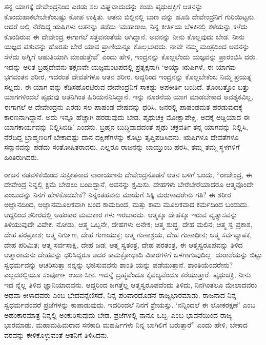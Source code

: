 ತನ್ನ ಯಾಗಕ್ಕೆ ದೇವೇಂದ್ರನಿಂದ ಎರಡು ಸಲ ವಿಘ್ನವಾದುದನ್ನು ಕಂಡು ಪೃಥುಚಕ್ರಿಗೆ ಆತನನ್ನು ಕೊಂದುಹಾಕಲೇಬೇಕೆಂಬಷ್ಟು ಕೋಪ ಉಕ್ಕಿತು. ಆತನು ಬಿಲ್ಲಿನಲ್ಲಿ ಬಾಣ ವನ್ನು ಹೂಡಿ ದೇವೇಂದ್ರನಿಗೆ ಗುರಿಯಿಟ್ಟನು. ಆದರೆ ಅಲ್ಲಿ ನೆರೆದಿದ್ದ ಋಷಿಗಳು ಆತನನ್ನು ತಡೆದು ‘ಮಹಾರಾಜ, ನಿನ್ನ ಕೀರ್ತಿಯ ಬೆಳಕಿನಲ್ಲಿ ಕಳೆಯನ್ನು ಕಳೆದು ಕೊಂಡಿರುವ ಈ ದೇವೇಂದ್ರ ಈಗಾಗಲೆ ಸತ್ತವನಂತೆಯೆ ಆಗಿದ್ದಾನೆ. ಅವನನ್ನು ನೀನು ಕೊಲ್ಲವುದು ಬೇಡ. ನೀನು ಯಜ್ಞದ ಪಶುವನ್ನು ಹೊರತು ಬೇರೆ ಯಾವ ಪ್ರಾಣಿಯನ್ನೂ ಕೊಲ್ಲಬಾರದು. ನಾವೇ ನಮ್ಮ ಮಂತ್ರದಿಂದ ಅವನನ್ನು ಸೆಳೆದು ಅಗ್ನಿಗೆ ಆಹುತಿಯಾಗಿ ಮಾಡುತ್ತೇವೆ’ ಎಂದು ಹೇಳಿ, ಇಂದ್ರನನ್ನು ಕೊಲ್ಲಲೆಂದು ಯಜ್ಞವನ್ನು ಪ್ರಾರಂಭಿಸಿ ದರು. ಇದನ್ನು ಅರಿತ ಬ್ರಹ್ಮದೇವನು ತಕ್ಷಣವೇ ಯಜ್ಞಮಂಟಪದಲ್ಲಿ ಪ್ರತ್ಯಕ್ಷನಾಗಿ ‘ಅಯ್ಯಾ ಋಷಿಗಳೆ, ಈ ಯಾಗವು ಭಗವಂತನ ಶರೀರ, ಇದರಂತೆ ದೇವತೆಗಳೂ ಆತನ ಶರೀರ. ಆದ್ದರಿಂದ ಇಂದ್ರನನ್ನು ಕೊಲ್ಲಬೇಕೆಂಬ ನಿಮ್ಮ ಪ್ರಯತ್ನ ಸಲ್ಲದು. ಈ ಯಾಗ ವನ್ನು ಕೆಡಿಸಹೊರಟಿರುವ ದೇವೇಂದ್ರನಿಗೆ ಸಾಕಷ್ಟು ಅಪಕೀರ್ತಿ ಬಂದಿದೆ. ತೊಂಬತ್ತೊಂ ಬತ್ತು ಯಾಗಗಳಿಂದಲೆ ಪೃಥುವು ಆತನಿಗಿಂತ ಹಿರಿಯನೆನಿಸಿದ್ದಾನೆ. ಇನ್ನು ನೂರನೆಯ ಯಾಗ ಮಾಡಬೇಕಾದ ಅವಶ್ಯಕವಿಲ್ಲ. ಈಗಾಗಲೆ ಆ ದೇವೇಂದ್ರನು ಎರಡು ಸಲ ಪಾಷಂಡ ವೇಷವನ್ನು ಧರಿಸಿ, ಜನರಲ್ಲಿ ಪಾಷಂಡಮತ ಹರಡುವುದಕ್ಕೆ ಕಾರಣನಾಗಿದ್ದಾನೆ. ಅದು ಇನ್ನೂ ಹೆಚ್ಚಾಗಿ ಹರಡುವುದು ಬೇಡ. ಪೃಥುಚಕ್ರಿ ಮೋಕ್ಷಾಪೇಕ್ಷಿ. ಅದಕ್ಕೆ ಅಡ್ಡಿಯಾದ ಈ ಯಾಗಕಾರ್ಯವನ್ನು ನಿಲ್ಲಿಸಿಬಿಡಿ’ ಎಂದನು. ಬ್ರಹ್ಮನ ಬುದ್ಧಿವಾದದಂತೆ ಪೃಥು ಚಕ್ರವರ್ತಿ ತನ್ನ ಯಾಗವನ್ನು ನಿಲ್ಲಿಸಿ, ನೆರೆದಿದ್ದ ಬ್ರಾಹ್ಮಣರಿಗೆ ಬೇಕಾದಷ್ಟು ದಾನ ದಕ್ಷಿಣೆಗಳನ್ನು ಕೊಟ್ಟು ತೃಪ್ತಿಪಡಿಸಿದನು. ಋಷಿಗಳೂ ದೇವತೆಗಳೂ ಸನ್ಮಾನವನ್ನು ಪಡೆದು ಸಂತೋಷಿತರಾದರು. ಎಲ್ಲರೂ ರಾಜನನ್ನು ಬಾಯ್ತುಂಬ ಹರಸಿ, ತಮ್ಮ ತಮ್ಮ ಸ್ಥಳಗಳಿಗೆ ಹಿಂತಿರುಗಿದರು.

ರಾಜನ ನಡವಳಿಕೆಯಿಂದ ಸುಪ್ರೀತನಾದ ನಾರಾಯಣನು ದೇವೇಂದ್ರನೊಡನೆ ಆತನ ಬಳಿಗೆ ಬಂದು, “ರಾಜೇಂದ್ರ, ಈ ದೇವೇಂದ್ರ ನಿನ್ನಲ್ಲಿ ಕ್ಷಮೆ ಬೇಡಲು ಬಂದಿದ್ದಾನೆ, ಅವನನ್ನು ಕ್ಷಮಿಸು. ದೇಹಗಳು ಬೇರೆಬೇರೆಯಾದರೂ ಆತ್ಮವೊಂದೇ ಎಂಬುದನ್ನು ನಿನಗೆ ಹೇಳಿಕೊಡಬೇಕೆ? ನಿನ್ನಂತಹವನು ಮಾಯೆಗೆ ಸಿಕ್ಕಿ ಮರುಳಾದರೇನು ಗತಿ? ಈ ಶರೀರ ಅಜ್ಞಾನದಿಂದ, ಅಜ್ಞಾನಮೂಲಕವಾಗಿ ಬಂದ ಕಾಮದಿಂದ, ಮತ್ತು ಕಾಮ ಮೂಲಕವಾದ ಕರ್ಮದಿಂದ ಬಂದುದು. ಆದ್ದರಿಂದ ಶರೀರದಲ್ಲಿ ಅಹಂಕಾರ ಮಮಕಾರ ಗಳು ಇರಬಾರದು. ಆತ್ಮಕ್ಕೂ ದೇಹಕ್ಕೂ ಇರುವ ವ್ಯತ್ಯಾಸವನ್ನು ತಿಳಿಯುವುದೇ ವಿವೇಕ. ನೋಡು, ಆತ್ಮ ಒಬ್ಬನೇ, ದೇಹಗಳು ಅನೇಕ; ಆತ್ಮ ಶುದ್ಧ, ದೇಹ ಮಲಿನ; ಆತ್ಮ ಸ್ವ ಪ್ರಕಾಶ, ದೇಹ ಪರಪ್ರಕಾಶ; ಆತ್ಮ ನಿರ್ಗುಣ, ದೇಹ ಗುಣಯುಕ್ತ; ಆತ್ಮ ಗುಣಾಶ್ರಯ, ದೇಹ ಗುಣಾಧೀನ; ಆತ್ಮ ಸರ್ವವ್ಯಾಪಕ, ದೇಹ ಪರಿಮಿತ; ಆತ್ಮ ಸರ್ವಸಾಕ್ಷಿ, ದೇಹ ಜಡ; ಆತ್ಮ ಸ್ವತಂತ್ರ, ದೇಹ ಪರತಂತ್ರ, ಈ ಆತ್ಮಸ್ವರೂಪವನ್ನು ತಿಳಿದ ಆತ್ಮಾರಾಮನು ದೇಹವನ್ನು ಧರಿಸಿದ್ದರೂ ಅದರ ಕಾಮಕ್ರೋಧಾದಿ ವಿಕಾರಗಳಿಗೆ ಒಳಗಾಗುವುದಿಲ್ಲ. ದುರಾಶೆಯನ್ನು ಬಿಟ್ಟು ಸ್ವಧರ್ಮವನ್ನು ಆಚರಿಸುತ್ತಾ ನನ್ನನ್ನು ಭಜಿಸುವವನು ಶಾಂತಿ ಯನ್ನು ಪಡೆಯುತ್ತಾನೆ. ಶಾಂತಿಯೆಂದರೇನು? ಎಲ್ಲದರಲ್ಲಿಯೂ ಸಂಪೂರ್ಣ ಉದಾ ಸೀನ. ಇದನ್ನೆ ಬ್ರಹ್ಮವೆಂದೂ ಕೈವಲ್ಯವೆಂದೂ ಕರೆಯುತ್ತಾರೆ. ಪೃಥುಚಕ್ರಿ, ನೀನು ಇದ ನ್ನೆಲ್ಲ ತಿಳಿದ ಜ್ಞಾನಿಯಾದವನು. ಆದ್ದರಿಂದ ಜಗತ್ತೆಲ್ಲ ಆತ್ಮಸ್ವರೂಪವೆಂದು ತಿಳಿದು, ನಿನಗಿಂತಲೂ ಮೇಲಾದವರು ಅಥವಾ ಕೀಳಾದವರು ಎಂಬ ಭೇದವನ್ನೆಣಿಸದೆ, ನಿನ್ನ ಪರಿವಾರದೊಡನೆ ರಾಜ್ಯಭಾರಮಾಡು. ರಾಜನಾದ ನಿನ್ನ ಸ್ವಧರ್ಮವೆಂದರೆ ಪ್ರಜೆಗಳನ್ನು ಕಾಪಾಡುವುದು. ಇದರಿಂದಲೆ ನಿನಗೆ ಶ್ರೇಯಸ್ಸು. ‘ನನ್ನಿಂದಲೆ ಈ ಲೋಕರಕ್ಷಣೆ’ ಎಂಬ ಅಹಂಕಾರಮಾತ್ರ ನಿನ್ನಲ್ಲಿ ಅಂಕುರಿಸುವುದು ಬೇಡ. ಪ್ರಜೆಗಳಲ್ಲಿ ನಾನೂ ಒಬ್ಬ–ಎಂಬ ಭಾವನೆಯಿಂದ ರಾಜ್ಯ ಭಾರಮಾಡು. ಮಹಾಮಹಿಮರಾದ ಸನಕಾದಿ ಮಹರ್ಷಿಗಳು ನಿನ್ನ ಬಾಗಿಲಿಗೆ ಬರುತ್ತಾರೆ” ಎಂದು ಹೇಳಿ, ಬೇಕಾದ ವರವನ್ನು ಕೇಳಿಕೊಳ್ಳುವಂತೆ ಆತನಿಗೆ ತಿಳಿಸಿದನು.

